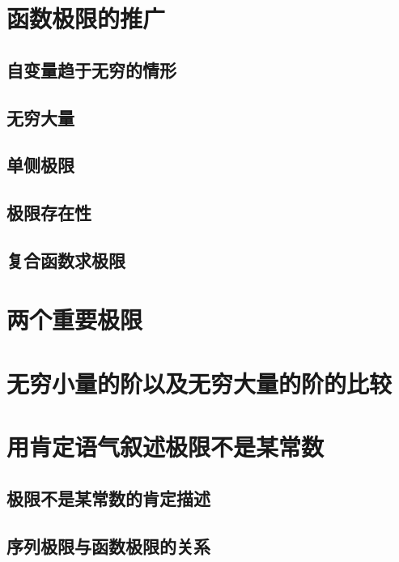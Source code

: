 \section{函数极限的推广}
\subsection{自变量趋于无穷的情形}
\subsection{无穷大量}
\subsection{单侧极限}
\subsection{极限存在性}
\subsection{复合函数求极限}
\begin{exercise}
\item
\end{exercise}
\section{两个重要极限}
\begin{exercise}
\item
\end{exercise}
\section{无穷小量的阶以及无穷大量的阶的比较}
\begin{exercise}
\item
\end{exercise}
\section{用肯定语气叙述极限不是某常数}
\subsection{极限不是某常数的肯定描述}
\subsection{序列极限与函数极限的关系}
\begin{exercise}
\item
\end{exercise}
\begin{exercise*}
\item
\end{exercise*}



\endinput
